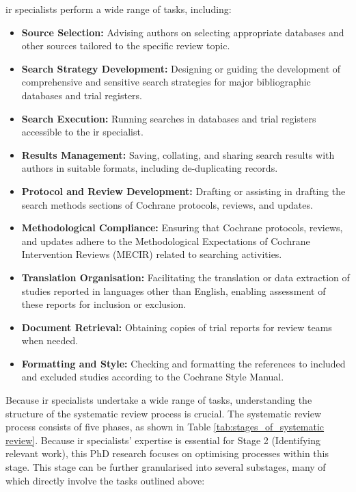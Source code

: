 \documentclass[10pt,oneside]{book}
\begin{document}
\gls*{ir} specialists perform a wide range of tasks, including:

\begin{itemize}
\item {\bf{Source Selection:}} Advising authors on selecting appropriate databases and other sources tailored to the specific review topic.
\item {\bf{Search Strategy Development:}} Designing or guiding the development of comprehensive and sensitive search strategies for major bibliographic databases and trial registers.
\item {\bf{Search Execution:}} Running searches in databases and trial registers accessible to the \gls*{ir} specialist.
\item {\bf{Results Management:}} Saving, collating, and sharing search results with authors in suitable formats, including de-duplicating records.
\item {\bf{Protocol and Review Development:}} Drafting or assisting in drafting the search methods sections of Cochrane protocols, reviews, and updates.
\item {\bf{Methodological Compliance:}} Ensuring that Cochrane protocols, reviews, and updates adhere to the Methodological Expectations of Cochrane Intervention Reviews (MECIR) related to searching activities.
\item {\bf{Translation Organisation:}} Facilitating the translation or data extraction of studies reported in languages other than English, enabling assessment of these reports for inclusion or exclusion.
\item {\bf{Document Retrieval:}} Obtaining copies of trial reports for review teams when needed.
\item {\bf{Formatting and Style:}} Checking and formatting the references to included and excluded studies according to the Cochrane Style Manual.
\end{itemize}

Because \gls*{ir} specialists undertake a wide range of tasks, understanding the structure of the systematic review process is crucial. The systematic review process consists of five phases, as shown in Table \ref{tab:stages_of_systematic review}. Because \gls*{ir} specialists' expertise is essential for Stage 2 (Identifying relevant work), this PhD research focuses on optimising processes within this stage. This stage can be further granularised into several substages, many of which directly involve the tasks outlined above:
\end{document}
